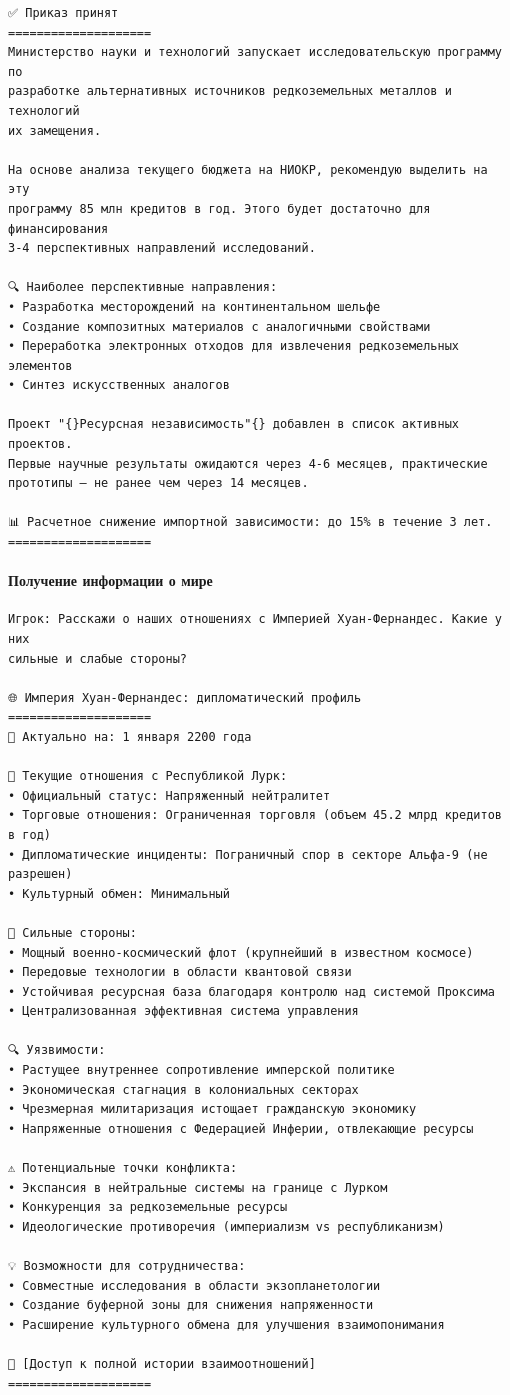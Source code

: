 \begin{verbatim}
✅ Приказ принят
====================
Министерство науки и технологий запускает исследовательскую программу по
разработке альтернативных источников редкоземельных металлов и технологий
их замещения.

На основе анализа текущего бюджета на НИОКР, рекомендую выделить на эту
программу 85 млн кредитов в год. Этого будет достаточно для финансирования
3-4 перспективных направлений исследований.

🔍 Наиболее перспективные направления:
• Разработка месторождений на континентальном шельфе
• Создание композитных материалов с аналогичными свойствами
• Переработка электронных отходов для извлечения редкоземельных элементов
• Синтез искусственных аналогов

Проект "{}Ресурсная независимость"{} добавлен в список активных проектов.
Первые научные результаты ожидаются через 4-6 месяцев, практические
прототипы — не ранее чем через 14 месяцев.

📊 Расчетное снижение импортной зависимости: до 15% в течение 3 лет.
====================
\end{verbatim}

\paragraph{Получение информации о мире}

\begin{verbatim}
Игрок: Расскажи о наших отношениях с Империей Хуан-Фернандес. Какие у них
сильные и слабые стороны?

🌐 Империя Хуан-Фернандес: дипломатический профиль
====================
📅 Актуально на: 1 января 2200 года

🤝 Текущие отношения с Республикой Лурк:
• Официальный статус: Напряженный нейтралитет
• Торговые отношения: Ограниченная торговля (объем 45.2 млрд кредитов в год)
• Дипломатические инциденты: Пограничный спор в секторе Альфа-9 (не разрешен)
• Культурный обмен: Минимальный

💪 Сильные стороны:
• Мощный военно-космический флот (крупнейший в известном космосе)
• Передовые технологии в области квантовой связи
• Устойчивая ресурсная база благодаря контролю над системой Проксима
• Централизованная эффективная система управления

🔍 Уязвимости:
• Растущее внутреннее сопротивление имперской политике
• Экономическая стагнация в колониальных секторах
• Чрезмерная милитаризация истощает гражданскую экономику
• Напряженные отношения с Федерацией Инферии, отвлекающие ресурсы

⚠️ Потенциальные точки конфликта:
• Экспансия в нейтральные системы на границе с Лурком
• Конкуренция за редкоземельные ресурсы
• Идеологические противоречия (империализм vs республиканизм)

💡 Возможности для сотрудничества:
• Совместные исследования в области экзопланетологии
• Создание буферной зоны для снижения напряженности
• Расширение культурного обмена для улучшения взаимопонимания

📜 [Доступ к полной истории взаимоотношений]
====================
\end{verbatim}

